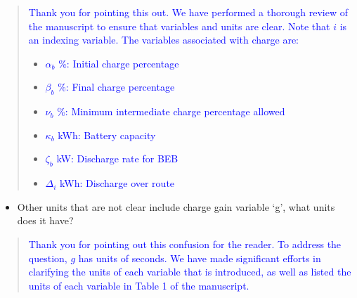 \documentclass[11pt,a4paper,final]{article}
\begin{document}
\begin{quote}
\textcolor{blue}{Thank you for pointing this out. We have performed a thorough review of the manuscript to ensure that variables and units are clear. Note that $i$ is an indexing variable. The variables associated with charge are:}

\begin{itemize}
\item \textcolor{blue}{$\alpha_b$ \%: Initial charge percentage}
\item \textcolor{blue}{$\beta_b$ \%: Final charge percentage}
\item \textcolor{blue}{$\nu_b$ \%: Minimum intermediate charge percentage allowed}
\item \textcolor{blue}{$\kappa_b$ kWh: Battery capacity}
\item \textcolor{blue}{$\zeta_b$ kW: Discharge rate for BEB}
\item \textcolor{blue}{$\Delta_i$ kWh: Discharge over route}
\end{itemize}
\end{quote}

\begin{itemize}
\item Other units that are not clear include charge gain variable ‘g’, what units does it have?
\end{itemize}

\begin{quote}
\textcolor{blue}{Thank you for pointing out this confusion for the reader. To address the question, $g$ has units of seconds. We have made significant efforts in clarifying the units of each variable that is introduced, as well as listed the units of each variable in Table 1 of the manuscript.}
\end{quote}
\end{document}
